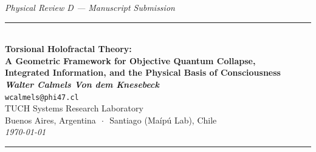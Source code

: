\documentclass[12pt,a4paper]{article}
\numberwithin{equation}{section}
\begin{document}

\begin{center}
  {\small\textit{Physical Review D --- Manuscript Submission}}\\[4pt]
  \rule{\textwidth}{1.2pt}\\[10pt]
  {\LARGE\bfseries\color{darkblue}
    Torsional Holofractal Theory:\\[4pt]
    A Geometric Framework for Objective Quantum Collapse,\\[4pt]
    Integrated Information, and the Physical Basis of Consciousness
  }\\[12pt]
  {\large\bfseries\itshape Walter Calmels Von dem Knesebeck}\\[4pt]
  {\normalsize\texttt{wcalmels@phi47.cl}}\\[4pt]
  {\normalsize TUCH Systems Research Laboratory}\\
  {\normalsize Buenos Aires, Argentina $\,\cdot\,$ Santiago (Ma\'ip\'u Lab), Chile}\\[6pt]
  {\normalsize\textit{\today}}\\[10pt]
  \rule{\textwidth}{1.2pt}
\end{center}
\end{document}
